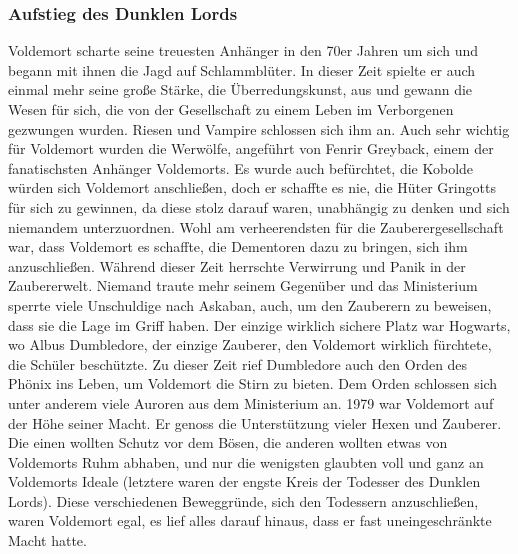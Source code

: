 \documentclass[a4paper, 10pt]{article}
\begin{document}
\subsubsection*{\large Aufstieg des Dunklen Lords}
Voldemort scharte seine treuesten Anhänger in den 70er Jahren um sich und begann mit ihnen die Jagd auf Schlammblüter.
\vspace{10pt}
\newline
{}  
In dieser Zeit spielte er auch einmal mehr seine große Stärke, die Überredungskunst, aus und gewann die Wesen für sich, die von der Gesellschaft zu einem Leben im Verborgenen gezwungen wurden. Riesen und Vampire schlossen sich ihm an. Auch sehr wichtig für Voldemort wurden die Werwölfe, angeführt von Fenrir Greyback, einem der fanatischsten Anhänger Voldemorts. Es wurde auch befürchtet, die Kobolde würden sich Voldemort anschließen, doch er schaffte es nie, die Hüter Gringotts für sich zu gewinnen, da diese stolz darauf waren, unabhängig zu denken und sich niemandem unterzuordnen. Wohl am verheerendsten für die Zauberergesellschaft war, dass Voldemort es schaffte, die Dementoren dazu zu bringen, sich ihm anzuschließen.
\vspace{10pt}
\newline
{}  
Während dieser Zeit herrschte Verwirrung und Panik in der Zaubererwelt. Niemand traute mehr seinem Gegenüber und das Ministerium sperrte viele Unschuldige nach Askaban, auch, um den Zauberern zu beweisen, dass sie die Lage im Griff haben.
\vspace{10pt}
\newline
{}  
Der einzige wirklich sichere Platz war Hogwarts, wo Albus Dumbledore, der einzige Zauberer, den Voldemort wirklich fürchtete, die Schüler beschützte. Zu dieser Zeit rief Dumbledore auch den Orden des Phönix ins Leben, um Voldemort die Stirn zu bieten. Dem Orden schlossen sich unter anderem viele Auroren aus dem Ministerium an.
\vspace{10pt}
\newline
{}  
1979 war Voldemort auf der Höhe seiner Macht. Er genoss die Unterstützung vieler Hexen und Zauberer. Die einen wollten Schutz vor dem Bösen, die anderen wollten etwas von Voldemorts Ruhm abhaben, und nur die wenigsten glaubten voll und ganz an Voldemorts Ideale (letztere waren der engste Kreis der Todesser des Dunklen Lords). Diese verschiedenen Beweggründe, sich den Todessern anzuschließen, waren Voldemort egal, es lief alles darauf hinaus, dass er fast uneingeschränkte Macht hatte.
\end{document}
